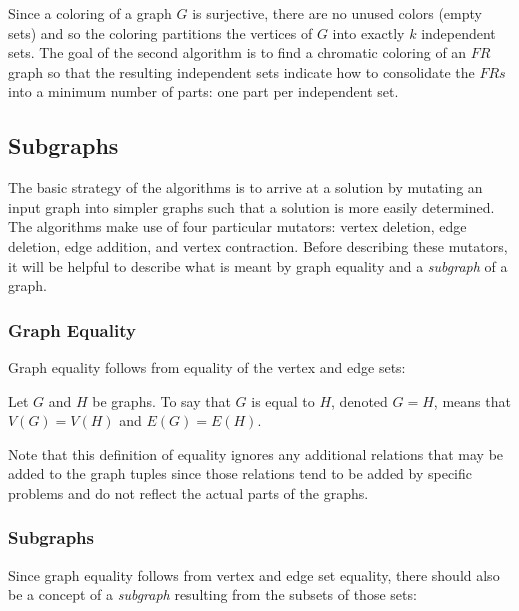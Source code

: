 Since a  coloring of a graph \(G\) is surjective, there are no unused colors (empty sets) and so the
coloring partitions the vertices of \(G\) into exactly \(k\) independent sets.  The goal of the second algorithm is
to find a chromatic coloring of an \(FR\) graph so that the resulting independent sets indicate how to consolidate
the \(FRs\) into a minimum number of parts: one part per independent set.

\subsection{Subgraphs}

The basic strategy of the algorithms is to arrive at a solution by mutating an input graph into simpler graphs such
that a solution is more easily determined.  The algorithms make use of four particular mutators: vertex deletion,
edge deletion, edge addition, and vertex contraction.  Before describing these mutators, it will be helpful to
describe what is meant by graph equality and a \emph{subgraph} of a graph.

\subsubsection{Graph Equality}

Graph equality follows from equality of the vertex and edge sets:

\begin{definition}
  Let \(G\) and \(H\) be graphs.  To say that \(G\) is equal to \(H\), denoted \(G=H\), means that \(V(G)=V(H)\)
  and \(E(G)=E(H)\).
\end{definition}

Note that this definition of equality ignores any additional relations that may be added to the graph tuples since
those relations tend to be added by specific problems and do not reflect the actual parts of the graphs.

\subsubsection{Subgraphs}

Since graph equality follows from vertex and edge set equality, there should also be a concept of a \emph{subgraph}
resulting from the subsets of those sets:

